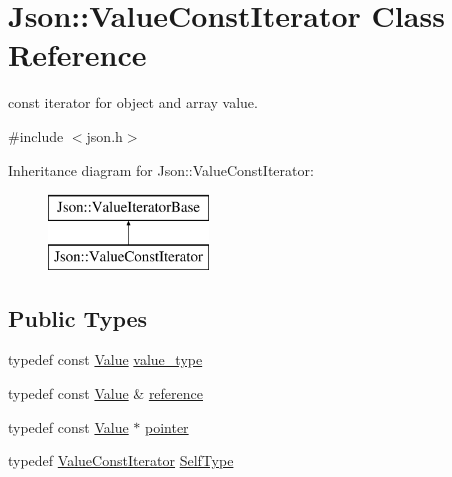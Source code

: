 \hypertarget{classJson_1_1ValueConstIterator}{}\section{Json\+:\+:Value\+Const\+Iterator Class Reference}
\label{classJson_1_1ValueConstIterator}


const iterator for object and array value.  




{\ttfamily \#include $<$json.\+h$>$}

Inheritance diagram for Json\+:\+:Value\+Const\+Iterator\+:\begin{figure}[H]
\begin{center}
\leavevmode
\includegraphics[height=2.000000cm]{classJson_1_1ValueConstIterator}
\end{center}
\end{figure}
\subsection*{Public Types}
\begin{DoxyCompactItemize}
\item 
typedef const \hyperlink{classJson_1_1Value}{Value} \hyperlink{classJson_1_1ValueConstIterator_aa5f1707dcef4bfe73e23ddc14dbe760d_aa5f1707dcef4bfe73e23ddc14dbe760d}{value\+\_\+type}
\item 
typedef const \hyperlink{classJson_1_1Value}{Value} \& \hyperlink{classJson_1_1ValueConstIterator_aa9b05c6a37cd352ea1ee6e13b816f709_aa9b05c6a37cd352ea1ee6e13b816f709}{reference}
\item 
typedef const \hyperlink{classJson_1_1Value}{Value} $\ast$ \hyperlink{classJson_1_1ValueConstIterator_a400136bd8bc09e9fddec0785fa2cff14_a400136bd8bc09e9fddec0785fa2cff14}{pointer}
\item 
typedef \hyperlink{classJson_1_1ValueConstIterator}{Value\+Const\+Iterator} \hyperlink{classJson_1_1ValueConstIterator_a0c2e33e7eb5a80dd8709fb28ece83933_a0c2e33e7eb5a80dd8709fb28ece83933}{Self\+Type}
\end{DoxyCompactItemize}
